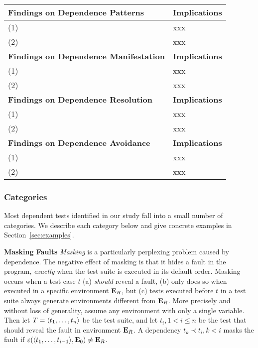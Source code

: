 \begin{table*}[t]
\vspace{1mm}
\centering
\small{
\begin{tabular}{|l|l|}
\hline
 \textbf{Findings on Dependence Patterns} & \textbf{Implications} \\
 \hline
 \hline
(1) & xxx \\
 \hline
(2) & xxx \\
\hline
 \textbf{Findings on Dependence Manifestation} & \textbf{Implications} \\
 \hline
 \hline
(1) & xxx \\
 \hline
(2) & xxx \\
\hline
 \textbf{Findings on Dependence Resolution} & \textbf{Implications} \\
 \hline
 \hline
(1) & xxx \\
 \hline
(2) & xxx \\
\hline
 \textbf{Findings on Dependence Avoidance} & \textbf{Implications} \\
 \hline
 \hline
(1) & xxx \\
 \hline
(2) & xxx \\
\hline
\end{tabular}
}
\vspace{-2mm}
\caption{{\label{tab:findings} }
}
\end{table*}

\subsubsection{Categories}

Most dependent tests identified in our study fall into a small
number of categories. We describe each category below and give
concrete examples in Section~\ref{sec:examples}.

\vspace{1mm}

\noindent \textbf{Masking Faults}
\emph{Masking} is a particularly perplexing problem caused by
dependence.
The negative effect of masking is that it hides a fault in the
program, \emph{exactly} when the test suite is executed in its default
order. 
Masking occurs when a test case $t$ (a) \emph{should}
reveal a fault, (b) only does so when executed in a specific environment
$\mathbf{E}_R$, but (c) tests executed before $t$ in a test suite always
generate environments different from
$\mathbf{E}_R$.
More precisely and without loss of generality, assume any
environment with only a single variable. Then let $T =
 \langle t_1,\dots,t_n \rangle $ be the test suite, and let $t_i, 1 < i \leq n$
be the test that should reveal the fault in environment $\mathbf{E}_R$. A
dependency $t_k \prec t_i, k < i$ masks the fault if
$\varepsilon( \langle t_1,\dots,t_{i-1} \rangle ,\mathbf{E}_0) \neq \mathbf{E}_R$.

